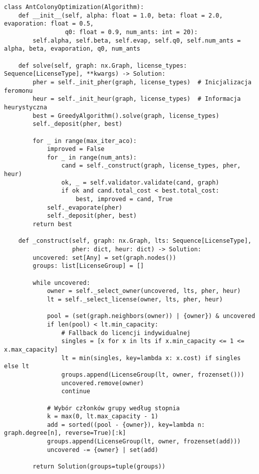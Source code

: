     {\footnotesize
        \begin{verbatim}
class AntColonyOptimization(Algorithm):
    def __init__(self, alpha: float = 1.0, beta: float = 2.0, evaporation: float = 0.5,
                 q0: float = 0.9, num_ants: int = 20):
        self.alpha, self.beta, self.evap, self.q0, self.num_ants = alpha, beta, evaporation, q0, num_ants

    def solve(self, graph: nx.Graph, license_types: Sequence[LicenseType], **kwargs) -> Solution:
        pher = self._init_pher(graph, license_types)  # Inicjalizacja feromonu
        heur = self._init_heur(graph, license_types)  # Informacja heurystyczna
        best = GreedyAlgorithm().solve(graph, license_types)
        self._deposit(pher, best)

        for _ in range(max_iter_aco):
            improved = False
            for _ in range(num_ants):
                cand = self._construct(graph, license_types, pher, heur)
                ok, _ = self.validator.validate(cand, graph)
                if ok and cand.total_cost < best.total_cost:
                    best, improved = cand, True
            self._evaporate(pher)
            self._deposit(pher, best)
        return best

    def _construct(self, graph: nx.Graph, lts: Sequence[LicenseType],
                   pher: dict, heur: dict) -> Solution:
        uncovered: set[Any] = set(graph.nodes())
        groups: list[LicenseGroup] = []

        while uncovered:
            owner = self._select_owner(uncovered, lts, pher, heur)
            lt = self._select_license(owner, lts, pher, heur)

            pool = (set(graph.neighbors(owner)) | {owner}) & uncovered
            if len(pool) < lt.min_capacity:
                # Fallback do licencji indywidualnej
                singles = [x for x in lts if x.min_capacity <= 1 <= x.max_capacity]
                lt = min(singles, key=lambda x: x.cost) if singles else lt
                groups.append(LicenseGroup(lt, owner, frozenset()))
                uncovered.remove(owner)
                continue

            # Wybór członków grupy według stopnia
            k = max(0, lt.max_capacity - 1)
            add = sorted((pool - {owner}), key=lambda n: graph.degree[n], reverse=True)[:k]
            groups.append(LicenseGroup(lt, owner, frozenset(add)))
            uncovered -= {owner} | set(add)

        return Solution(groups=tuple(groups))


\end{verbatim}}
